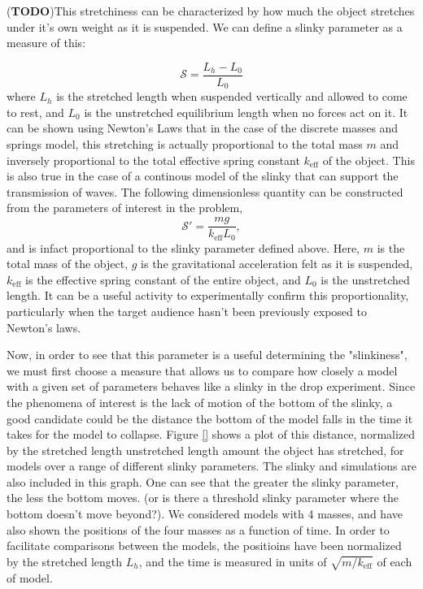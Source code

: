 \documentclass[prb,preprint]{revtex4-1}
\newcommand{\TODO}[1]{\marginpar{\raggedright\scriptsize\textbf{TODO:} #1} (\textbf{TODO})}
\begin{document}
\TODO{Motivate this defninition.}This stretchiness can be characterized by how much the object stretches
under it's own weight as it is suspended.   We can define a slinky parameter as a measure of this:

\begin{equation}
\mathcal{S}=\frac{L_h-L_0}{L_0}
\end{equation}
where $L_h$ is the stretched length when suspended vertically and allowed to come to rest, and $L_0$ is the unstretched equilibrium length
when no forces act on it.  It can be shown using Newton's Laws that in the case of the discrete masses and springs model,
this stretching is actually proportional to the total mass $m$ and inversely proportional to the total effective spring constant $k_{\text{eff}}$ of the object.
This is also true in the case of a continous model of the slinky that can support the transmission of waves.  The following dimensionless quantity
can be constructed from the parameters of interest in the problem,
\begin{equation}
\mathcal{S'}=\frac{m g}{k_\text{eff} L_0 },
\end{equation}
 and is infact proportional to the  slinky parameter defined above.  Here, $m$ is the total mass of the object, $g$ is the gravitational acceleration felt as it is suspended, $k_\text{eff}$ is the effective spring constant of the entire object, and $L_0$ is the unstretched length.  It can be a useful activity to experimentally 
confirm this proportionality, particularly when the target audience hasn't been previously exposed to Newton's laws.

Now, in order to see that this parameter is a useful determining the "slinkiness", we must first choose a measure that allows us to compare how closely a model
with a given set of parameters behaves like a slinky in the drop experiment.  Since the phenomena of interest is the lack of motion of the bottom of the slinky, 
a good candidate could be the distance the bottom of the model falls in the time it takes for the model to collapse.  Figure \ref{} shows a plot of this distance, normalized by the stretched length unstretched length amount the object has stretched, for models over a range of different slinky parameters.  The slinky and simulations are also included in this graph.  One can see that the greater the slinky parameter, the less the bottom moves.  (or is there a threshold slinky parameter where  the bottom doesn't move beyond?).  We considered models with 4 masses, and have also shown the positions of the four masses as a function of time.  In order to facilitate comparisons between the models, the positioins have been normalized by the stretched length $L_h$, and the time is measured in units of $\sqrt{m/k_{\text{eff}}}$ of each of model.  
\end{document}
